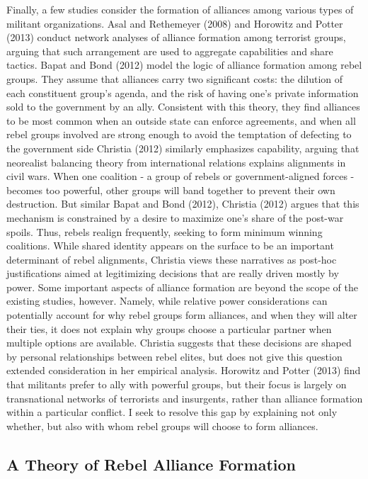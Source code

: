 \documentclass[12pt,]{article}
\begin{document}
Finally, a few studies consider the formation of alliances among various
types of militant organizations. Asal and Rethemeyer (2008) and Horowitz
and Potter (2013) conduct network analyses of alliance formation among
terrorist groups, arguing that such arrangement are used to aggregate
capabilities and share tactics. Bapat and Bond (2012) model the logic of
alliance formation among rebel groups. They assume that alliances carry
two significant costs: the dilution of each constituent group's agenda,
and the risk of having one's private information sold to the government
by an ally. Consistent with this theory, they find alliances to be most
common when an outside state can enforce agreements, and when all rebel
groups involved are strong enough to avoid the temptation of defecting
to the government side Christia (2012) similarly emphasizes capability,
arguing that neorealist balancing theory from international relations
explains alignments in civil wars. When one coalition - a group of
rebels or government-aligned forces - becomes too powerful, other groups
will band together to prevent their own destruction. But similar Bapat
and Bond (2012), Christia (2012) argues that this mechanism is
constrained by a desire to maximize one's share of the post-war spoils.
Thus, rebels realign frequently, seeking to form minimum winning
coalitions. While shared identity appears on the surface to be an
important determinant of rebel alignments, Christia views these
narratives as post-hoc justifications aimed at legitimizing decisions
that are really driven mostly by power. Some important aspects of
alliance formation are beyond the scope of the existing studies,
however. Namely, while relative power considerations can potentially
account for why rebel groups form alliances, and when they will alter
their ties, it does not explain why groups choose a particular partner
when multiple options are available. Christia suggests that these
decisions are shaped by personal relationships between rebel elites, but
does not give this question extended consideration in her empirical
analysis. Horowitz and Potter (2013) find that militants prefer to ally
with powerful groups, but their focus is largely on transnational
networks of terrorists and insurgents, rather than alliance formation
within a particular conflict. I seek to resolve this gap by explaining
not only whether, but also with whom rebel groups will choose to form
alliances.

\subsection{A Theory of Rebel Alliance
Formation}\label{a-theory-of-rebel-alliance-formation}
\end{document}
